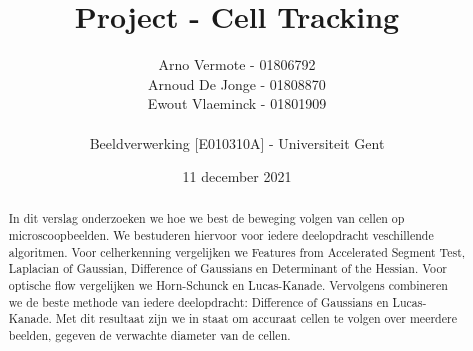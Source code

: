 \documentclass{article}
\title{Project - Cell Tracking}
\author{Arno Vermote - 01806792 \\
Arnoud De Jonge - 01808870 \\
Ewout Vlaeminck - 01801909 \\\\
Beeldverwerking [E010310A] - Universiteit Gent}
\date{11 december 2021}
\begin{document}
\maketitle

\begin{abstract}
In dit verslag onderzoeken we hoe we best de beweging volgen van cellen op microscoopbeelden. We bestuderen hiervoor voor iedere deelopdracht veschillende algoritmen. Voor celherkenning vergelijken we Features from Accelerated Segment Test, Laplacian of Gaussian, Difference of Gaussians en Determinant of the Hessian. Voor optische flow vergelijken we Horn-Schunck en Lucas-Kanade. Vervolgens combineren we de beste methode van iedere deelopdracht: Difference of Gaussians en Lucas-Kanade. Met dit resultaat zijn we in staat om accuraat cellen te volgen over meerdere beelden, gegeven de verwachte diameter van de cellen.

\end{abstract}
\end{document}
